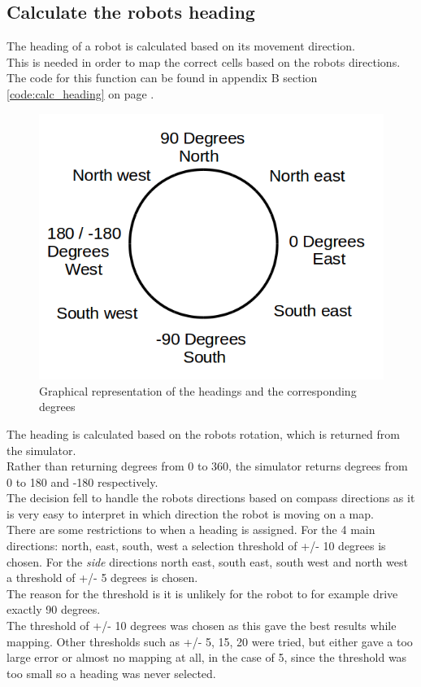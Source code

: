 \subsection{Calculate the robots heading}
\label{chap3:calc_heading}
The heading of a robot is calculated based on its movement direction. \\
This is needed in order to map the correct cells based on the robots directions. 
The code for this function can be found in appendix B section \ref{code:calc_heading} on page \pageref{code:calc_heading}.\\

\begin{figure}[h]
\centering
\includegraphics[scale=0.5]{Chapter3/images/heading.png}
\caption{Graphical representation of the headings and the corresponding degrees}
\label{fig:heading}
\end{figure}

The heading is calculated based on the robots rotation, which is returned from the simulator. \\
Rather than returning degrees from 0 to 360, the simulator returns degrees from 0 to 180 and -180 respectively.\\
The decision fell to handle the robots directions based on compass directions as it is very easy to interpret in which direction the robot is moving on a map.\\
There are some restrictions to when a heading is assigned. For the 4 main directions: north, east, south, west a selection threshold of +/- 10 degrees is chosen. 
For the \textit{side} directions north east, south east, south west and north west a threshold of +/- 5 degrees is chosen. \\
The reason for the threshold is it is unlikely for the robot to for example drive exactly 90 degrees. \\
The threshold of +/- 10 degrees was chosen as this gave the best results while mapping. Other thresholds such as +/- 5, 15, 20 were tried, but either gave a too large error or almost no mapping at all, in the case of 5, since the threshold was too small so a heading was never selected.\\

